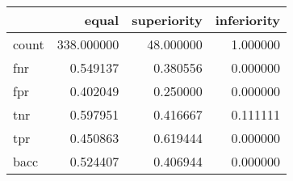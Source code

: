\begin{tabular}{lrrr}
\toprule
{} &       equal &  superiority &  inferiority \\
\midrule
count &  338.000000 &    48.000000 &     1.000000 \\
fnr   &    0.549137 &     0.380556 &     0.000000 \\
fpr   &    0.402049 &     0.250000 &     0.000000 \\
tnr   &    0.597951 &     0.416667 &     0.111111 \\
tpr   &    0.450863 &     0.619444 &     0.000000 \\
bacc  &    0.524407 &     0.406944 &     0.000000 \\
\bottomrule
\end{tabular}

